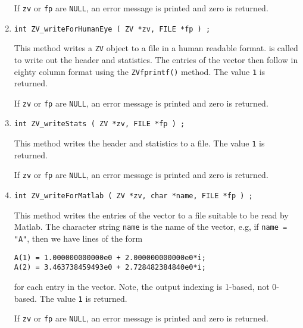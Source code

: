 \begin{enumerate}
\par {}
If {\tt zv} or {\tt fp} are {\tt NULL},
an error message is printed and zero is returned.
\item
\begin{verbatim}
int ZV_writeForHumanEye ( ZV *zv, FILE *fp ) ;
\end{verbatim}
\par
This method writes a {\tt ZV} object to a file in a human
readable format.
is called to write out the
header and statistics. 
The entries of the vector then follow in eighty column format
using the {\tt ZVfprintf()} method.
The value {\tt 1} is returned.
\par {}
If {\tt zv} or {\tt fp} are {\tt NULL},
an error message is printed and zero is returned.
\item
\begin{verbatim}
int ZV_writeStats ( ZV *zv, FILE *fp ) ;
\end{verbatim}
\par
This method writes the header and statistics to a file.
The value {\tt 1} is returned.
\par {}
If {\tt zv} or {\tt fp} are {\tt NULL},
an error message is printed and zero is returned.
\item
\begin{verbatim}
int ZV_writeForMatlab ( ZV *zv, char *name, FILE *fp ) ;
\end{verbatim}
\par
This method writes the entries of the vector to a file
suitable to be read by Matlab.
The character string {\tt name} is the name of the vector,
e.g, if {\tt name = "A"}, then we have lines of the form
\begin{verbatim}
A(1) = 1.000000000000e0 + 2.000000000000e0*i;
A(2) = 3.463738459493e0 + 2.728482384840e0*i;
\end{verbatim}
for each entry in the vector.
Note, the output indexing is 1-based, not 0-based.
The value {\tt 1} is returned.
\par {}
If {\tt zv} or {\tt fp} are {\tt NULL},
an error message is printed and zero is returned.
\end{enumerate}
